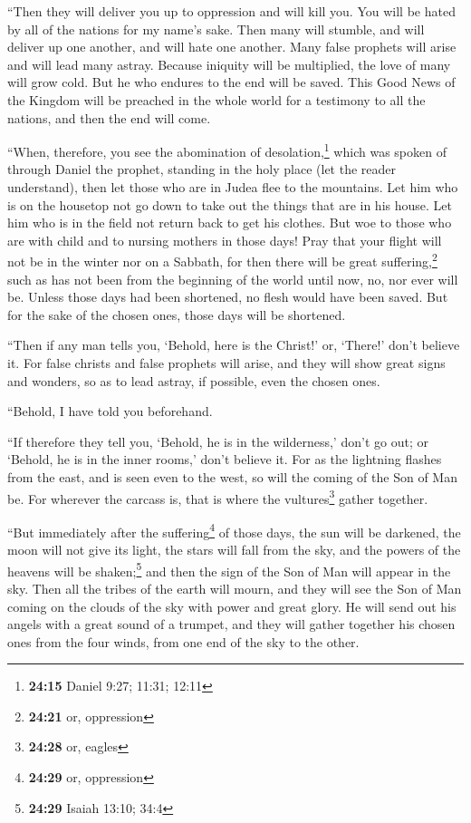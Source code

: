  ``Then they will deliver you up to oppression and will
kill you. You will be hated by all of the nations for my name's sake.
 Then many will stumble, and will deliver up one another,
and will hate one another.  Many false prophets will
arise and will lead many astray.  Because iniquity will
be multiplied, the love of many will grow cold.  But he
who endures to the end will be saved.  This Good News of
the Kingdom will be preached in the whole world for a testimony to all
the nations, and then the end will come.

 ``When, therefore, you see the abomination of
desolation,\footnote{\textbf{24:15} Daniel 9:27; 11:31; 12:11} which was
spoken of through Daniel the prophet, standing in the holy place (let
the reader understand),  then let those who are in Judea
flee to the mountains.  Let him who is on the housetop
not go down to take out the things that are in his house.
 Let him who is in the field not return back to get his
clothes.  But woe to those who are with child and to
nursing mothers in those days!  Pray that your flight
will not be in the winter nor on a Sabbath,  for then
there will be great suffering,\footnote{\textbf{24:21} or, oppression}
such as has not been from the beginning of the world until now, no, nor
ever will be.  Unless those days had been shortened, no
flesh would have been saved. But for the sake of the chosen ones, those
days will be shortened.

 ``Then if any man tells you, `Behold, here is the
Christ!' or, `There!' don't believe it.  For false
christs and false prophets will arise, and they will show great signs
and wonders, so as to lead astray, if possible, even the chosen ones.

 ``Behold, I have told you beforehand.

 ``If therefore they tell you, `Behold, he is in the
wilderness,' don't go out; or `Behold, he is in the inner rooms,' don't
believe it.  For as the lightning flashes from the east,
and is seen even to the west, so will the coming of the Son of Man be.
 For wherever the carcass is, that is where the
vultures\footnote{\textbf{24:28} or, eagles} gather together.

 ``But immediately after the suffering\footnote{\textbf{24:29}
  or, oppression} of those days, the sun will be darkened, the moon will
not give its light, the stars will fall from the sky, and the powers of
the heavens will be shaken;\footnote{\textbf{24:29} Isaiah 13:10; 34:4}
 and then the sign of the Son of Man will appear in the
sky. Then all the tribes of the earth will mourn, and they will see the
Son of Man coming on the clouds of the sky with power and great glory.
 He will send out his angels with a great sound of a
trumpet, and they will gather together his chosen ones from the four
winds, from one end of the sky to the other.

